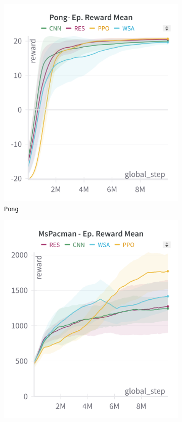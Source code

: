 \begin{figure}[ht]
    \centering
    \begin{subfigure}[b]{0.32\textwidth}
        \centering
        \includegraphics[width=\textwidth]{images/pong_train}
        \caption{\texttt{Pong}}
        \label{fig:pongtraining}
    \end{subfigure}
    \hfill
    \begin{subfigure}[b]{0.32\textwidth}
        \centering
        \includegraphics[width=\textwidth]{images/mspacman_train}

\end{subfigure}
\end{figure}
